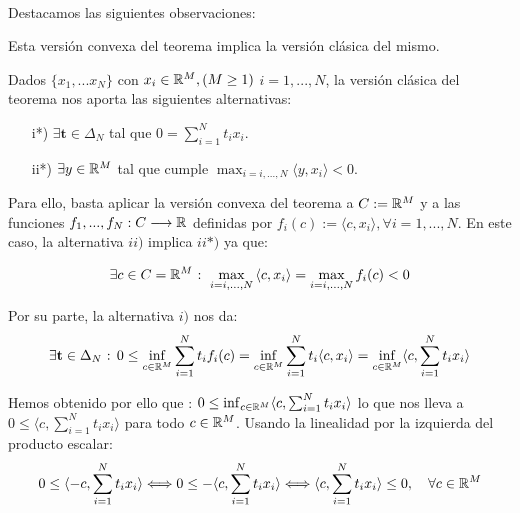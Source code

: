 	\paragraph{} Destacamos las siguientes observaciones:
	
	\begin{observacion}
		Esta versión convexa del teorema implica la versión clásica del mismo.
	\end{observacion}

	Dados $ \{x_1,...x_N\}$ con $ x_i \in \mathbb{R}^M , (M \geq 1 )$ $i=1,...,N$, la versión clásica del teorema nos aporta las siguientes alternativas:

	\begin{itemize}
		\item[i*)] $ \exists \mathbf{t} \in \Delta_N $ tal que $ 0 = \sum_{i=1}^{N}{t_i x_i}$.
		\item[ii*)] $ \exists y \in \mathbb{R}^M $ tal que cumple $ \max_{i=i,...,N} \langle y, x_i \rangle < 0 $.
	\end{itemize}

	Para ello, basta aplicar la versión convexa del teorema a $ C := \mathbb{R}^M $ y a las funciones $ f_1,...,f_N : C \longrightarrow \mathbb{R} $ definidas por $ f_i(c):=\langle c,x_i \rangle , \forall i=1,...,N  $. En este caso, la alternativa $ ii) $ implica $ ii*) $ ya que:
	
	\begin{equation*}
		\exists c \in C = \mathbb{R}^M \text{ : } \max_{i=i,...,N} {\langle c,x_i \rangle}  =  \max_{i=i,...,N}f_i (c) < 0 
	\end{equation*}
	
	Por su parte, la alternativa $ i) $ nos da:
	\begin{equation*}
		\exists \mathbf{t} \in \Delta_N \text{ : } 0 \leq \inf_{c \in \mathbb{R}^M}  \sum_{i=1}^{N}{t_i f_i(c) } = \inf_{c \in \mathbb{R}^M} \sum_{i=1}^{N}{t_i\langle c,x_i \rangle} = \inf_{c \in \mathbb{R}^M} \langle c, \sum_{i=1}^{N}{t_i x_i} \rangle 
	\end{equation*}
	
	Hemos obtenido por ello que : $0  \leq \inf_{c \in \mathbb{R}^M} \langle c, \sum_{i=1}^{N}{t_i x_i} \rangle  $ lo que nos lleva a $ 0 \leq \langle c, \sum_{i=1}^{N}{t_i x_i} \rangle  $ para todo $ c \in \mathbb{R}^M $. Usando la linealidad por la izquierda del producto escalar:
	\[
	0 \leq \langle -c, \sum_{i=1}^{N}{t_i x_i} \rangle \Longleftrightarrow 	0 \leq -\langle c, \sum_{i=1}^{N}{t_i x_i} \rangle 
	\Longleftrightarrow  \langle c, \sum_{i=1}^{N}{t_i x_i}\rangle \leq 0, \quad \forall c \in \mathbb{R}^M
	\]
	
